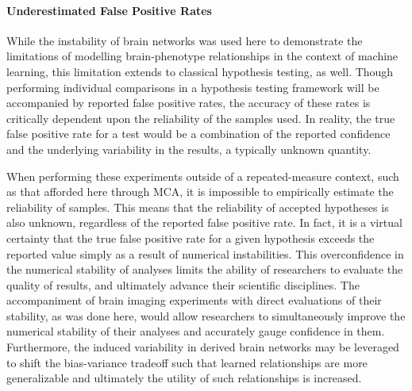 \documentclass[fleqn,10pt]{SelfArx} %
\begin{document}
\paragraph{Underestimated False Positive Rates}
While the instability of brain networks was used here to demonstrate the limitations of modelling brain-phenotype
relationships in the context of machine learning, this limitation extends to classical hypothesis testing, as well.
Though performing individual comparisons in a hypothesis testing framework will be accompanied by reported false
positive rates, the accuracy of these rates is critically dependent upon the reliability of the samples used. In
reality, the true false positive rate for a test would be a combination of the reported confidence and the underlying
variability in the results, a typically unknown quantity.

When performing these experiments outside of a repeated-measure context, such as that afforded here through MCA, it is
impossible to empirically estimate the reliability of samples. This means that the reliability of accepted hypotheses
is also unknown, regardless of the reported false positive rate. In fact, it is a virtual certainty that the true false
positive rate for a given hypothesis exceeds the reported value simply as a result of numerical instabilities. This
overconfidence in the numerical stability of analyses limits the ability of researchers to evaluate the quality of
results, and ultimately advance their scientific disciplines. The accompaniment of brain imaging experiments with
direct evaluations of their stability, as was done here, would allow researchers to simultaneously improve the
numerical stability of their analyses and accurately gauge confidence in them. Furthermore, the induced variability in
derived brain networks may be leveraged to shift the bias-variance tradeoff such that learned relationships are more
generalizable and ultimately the utility of such relationships is increased.
\end{document}
